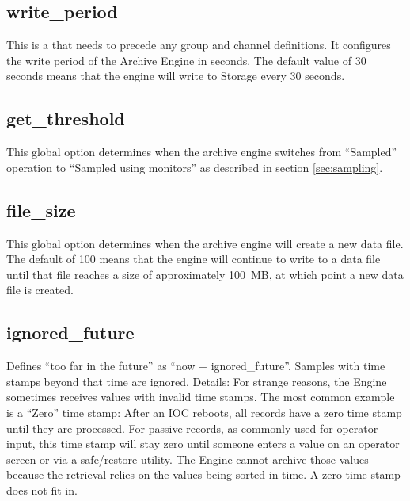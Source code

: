 



\clearpage

\subsection{write\_period}
This is a  that needs to precede any group and
channel definitions.  It configures the write period of the Archive
Engine in seconds. The default value of 30 seconds means that the
engine will write to Storage every 30 seconds.

\subsection{get\_threshold}
This global option determines when the archive engine switches from
``Sampled'' operation to ``Sampled using monitors'' as described in
section \ref{sec:sampling}.

\subsection{file\_size}
This global option determines when the archive engine will create a
new data file. The default of 100 means that the engine will continue
to write to a data file until that file reaches a size of
approximately 100~MB, at which point a new data file is created.

\subsection{ignored\_future}
Defines ``too far in the future'' as ``now $+$ ignored\_future''.
Samples with time stamps beyond that time are ignored.  Details: For
strange reasons, the Engine sometimes receives values with invalid
time stamps. The most common example is a ``Zero'' time stamp: After
an IOC reboots, all records have a zero time stamp until they are
processed. For passive records, as commonly used for operator input,
this time stamp will stay zero until someone enters a value on an
operator screen or via a safe/restore utility. The Engine cannot
archive those values because the retrieval relies on the values being
sorted in time. A zero time stamp does not fit in.

